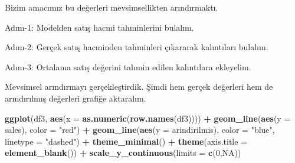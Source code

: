 \documentclass[
]{book}
\newenvironment{Shaded}{\begin{snugshade}}{\end{snugshade}}
\newcommand{\DataTypeTok}[1]{\textcolor[rgb]{0.13,0.29,0.53}{#1}}
\newcommand{\DecValTok}[1]{\textcolor[rgb]{0.00,0.00,0.81}{#1}}
\newcommand{\KeywordTok}[1]{\textcolor[rgb]{0.13,0.29,0.53}{\textbf{#1}}}
\newcommand{\NormalTok}[1]{#1}
\newcommand{\OperatorTok}[1]{\textcolor[rgb]{0.81,0.36,0.00}{\textbf{#1}}}
\newcommand{\OtherTok}[1]{\textcolor[rgb]{0.56,0.35,0.01}{#1}}
\newcommand{\StringTok}[1]{\textcolor[rgb]{0.31,0.60,0.02}{#1}}
\begin{document}
Bizim amacımız bu değerleri mevsimsellikten arındırmaktı.

Adım-1: Modelden satış hacmi tahminlerini bulalım.

\begin{Shaded}
\end{Shaded}

Adım-2: Gerçek satış hacminden tahminleri çıkararak kalıntıları bulalım.

\begin{Shaded}
\end{Shaded}

Adım-3: Ortalama satış değerini tahmin edilen kalıntılara ekleyelim.

\begin{Shaded}
\end{Shaded}

Mevsimsel arındırmayı gerçekleştirdik. Şimdi hem gerçek değerleri hem de arındırılmış değerleri grafiğe aktaralım.

\begin{Shaded}
\begin{Highlighting}[]
\KeywordTok{ggplot}\NormalTok{(df3, }\KeywordTok{aes}\NormalTok{(}\DataTypeTok{x =} \KeywordTok{as.numeric}\NormalTok{(}\KeywordTok{row.names}\NormalTok{(df3)))) }\OperatorTok{+}
\StringTok{  }\KeywordTok{geom_line}\NormalTok{(}\KeywordTok{aes}\NormalTok{(}\DataTypeTok{y =}\NormalTok{ sales), }\DataTypeTok{color =} \StringTok{"red"}\NormalTok{) }\OperatorTok{+}
\StringTok{  }\KeywordTok{geom_line}\NormalTok{(}\KeywordTok{aes}\NormalTok{(}\DataTypeTok{y =}\NormalTok{ arindirilmis), }\DataTypeTok{color =} \StringTok{"blue"}\NormalTok{, }\DataTypeTok{linetype =} \StringTok{"dashed"}\NormalTok{) }\OperatorTok{+}
\StringTok{  }\KeywordTok{theme_minimal}\NormalTok{() }\OperatorTok{+}
\StringTok{  }\KeywordTok{theme}\NormalTok{(}\DataTypeTok{axis.title =} \KeywordTok{element_blank}\NormalTok{()) }\OperatorTok{+}
\StringTok{  }\KeywordTok{scale_y_continuous}\NormalTok{(}\DataTypeTok{limits =} \KeywordTok{c}\NormalTok{(}\DecValTok{0}\NormalTok{,}\OtherTok{NA}\NormalTok{))}
\end{Highlighting}
\end{Shaded}
\end{document}
